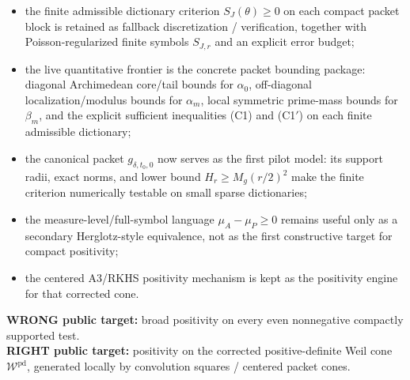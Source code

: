 \begin{itemize}
  \item the finite admissible dictionary criterion $S_J(\theta)\ge0$ on each
  compact packet block is retained as fallback discretization / verification,
  together with Poisson-regularized finite symbols $S_{J,r}$ and an explicit error budget;
  \item the live quantitative frontier is the concrete packet bounding package:
  diagonal Archimedean core/tail bounds for $\alpha_0$, off-diagonal
  localization/modulus bounds for $\alpha_m$, local symmetric prime-mass bounds
  for $\beta_m$, and the explicit sufficient inequalities \textup{(C1)} and
  \textup{(C1$'$)} on each finite admissible dictionary;
  \item the canonical packet $g_{\delta,t_0,0}$ now serves as the first pilot
  model: its support radii, exact norms, and lower bound $H_r\ge M_g(r/2)^2$
  make the finite criterion numerically testable on small sparse dictionaries;
  \item the measure-level/full-symbol language $\mu_A-\mu_P\ge 0$ remains useful
  only as a secondary Herglotz-style equivalence, not as the first constructive
  target for compact positivity;
  \item the centered A3/RKHS positivity mechanism is kept as the positivity engine
  for that corrected cone.
\end{itemize}

\begin{tcolorbox}[colback=white,colframe=black!60]
\textbf{WRONG public target:} broad positivity on every even nonnegative compactly supported test.\\
\textbf{RIGHT public target:} positivity on the corrected positive-definite Weil cone
$\mathcal W^{\mathrm{pd}}$, generated locally by convolution squares / centered packet cones.
\end{tcolorbox}
\fi
